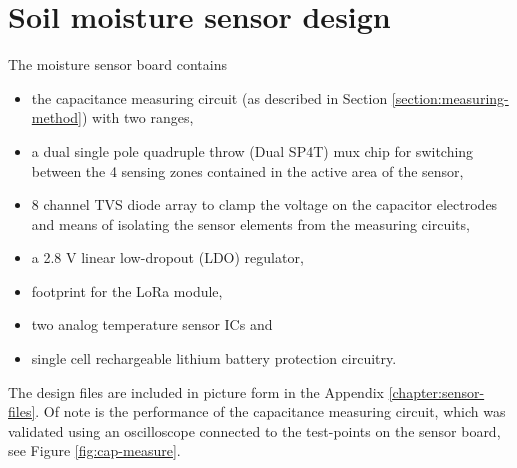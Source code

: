 \section{Soil moisture sensor design}
The moisture sensor board contains 
\begin{itemize}
    \item the capacitance measuring circuit (as described in Section \ref{section:measuring-method}) with two ranges,
    \item a dual single pole quadruple throw (Dual SP4T) mux chip for switching between the 4 sensing zones contained in the active area of the sensor,
    \item 8 channel TVS diode array to clamp the voltage on the capacitor electrodes and means of isolating the sensor elements from the measuring circuits,
    \item a 2.8 V linear low-dropout (LDO) regulator,
    \item footprint for the LoRa module,
    \item two analog temperature sensor ICs and
    \item single cell rechargeable lithium battery protection circuitry.
\end{itemize}

The design files are included in picture form in the Appendix \ref{chapter:sensor-files}. Of note is the performance of the capacitance measuring circuit, which was validated using an oscilloscope connected to the test-points on the sensor board, see Figure \ref{fig:cap-measure}.

